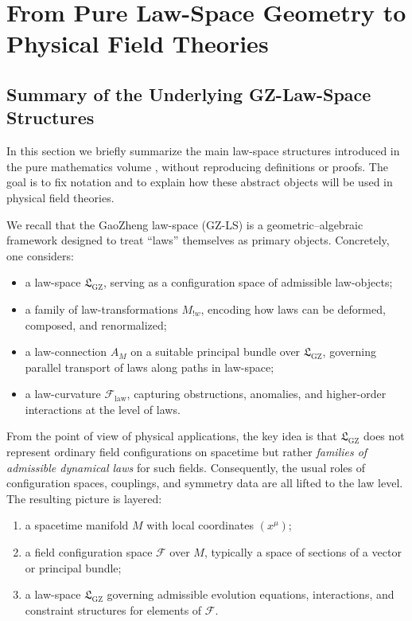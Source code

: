 \documentclass[11pt]{book}
\newcommand{\GZLS}{\ensuremath{\mathfrak{L}_{\mathrm{GZ}}}}
\newcommand{\GZLT}{\ensuremath{M_{!w}}}
\newcommand{\GZLOC}{\ensuremath{A_M}}
\newcommand{\GZLCurv}{\ensuremath{\mathcal{F}_{\mathrm{law}}}}
\theoremstyle{plain}
\theoremstyle{definition}
\theoremstyle{remark}
\begin{document}
\chapter[From Pure Law-Space Geometry to Physical Field Theories]{From Pure Law-Space Geometry to Physical Field Theories}
\label{chap:phys-intro}



\section{Summary of the Underlying GZ-Law-Space Structures}
\label{sec:lawspace-summary}

In this section we briefly summarize the main law-space structures
introduced in the pure mathematics volume \cite{GaoZheng2025GFramework},
without reproducing definitions or proofs. The goal is to fix notation
and to explain how these abstract objects will be used in physical
field theories.

We recall that the GaoZheng law-space (GZ-LS) is a geometric--algebraic
framework designed to treat ``laws'' themselves as primary objects.
Concretely, one considers:
\begin{itemize}
  \item a law-space $\GZLS$, serving as a configuration space of
        admissible law-objects;
  \item a family of law-transformations $\GZLT$, encoding how laws
        can be deformed, composed, and renormalized;
  \item a law-connection $\GZLOC$ on a suitable principal bundle
        over $\GZLS$, governing parallel transport of laws along
        paths in law-space;
  \item a law-curvature $\GZLCurv$, capturing obstructions, anomalies,
        and higher-order interactions at the level of laws.
\end{itemize}



From the point of view of physical applications, the key idea is that
$\GZLS$ does not represent ordinary field configurations on spacetime
but rather \emph{families of admissible dynamical laws} for such fields.
Consequently, the usual roles of configuration spaces, couplings, and
symmetry data are all lifted to the law level. The resulting picture is
layered:
\begin{enumerate}
  \item a spacetime manifold $M$ with local coordinates $(x^\mu)$;
  \item a field configuration space $\mathcal{F}$ over $M$, typically
        a space of sections of a vector or principal bundle;
  \item a law-space $\GZLS$ governing admissible evolution equations,
        interactions, and constraint structures for elements of
        $\mathcal{F}$.
\end{enumerate}
\end{document}
